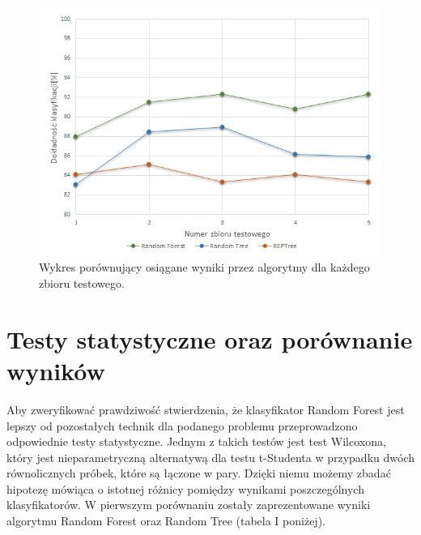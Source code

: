\documentclass[conference]{IEEEtran}
\begin{document}
\begin{figure}[htbp]
\centerline{\includegraphics[scale=0.65]{pic/CV_chart.png}}
\caption{Wykres porównujący osiągane wyniki przez algorytmy dla każdego zbioru testowego.}
\label{CV_chart}
\end{figure}

\section{Testy statystyczne oraz porównanie wyników}
Aby zweryfikować prawdziwość stwierdzenia, że klasyfikator Random Forest jest lepszy od pozostałych technik dla podanego problemu przeprowadzono odpowiednie testy statystyczne. 
Jednym z takich testów jest test Wilcoxona, który jest nieparametryczną alternatywą dla testu t-Studenta w przypadku dwóch równolicznych próbek, które są łączone w pary. Dzięki niemu możemy zbadać hipotezę mówiąca o istotnej różnicy pomiędzy wynikami poszczególnych klasyfikatorów. W pierwszym porównaniu zostały zaprezentowane wyniki algorytmu Random Forest oraz Random Tree (tabela I poniżej). 
\end{document}
